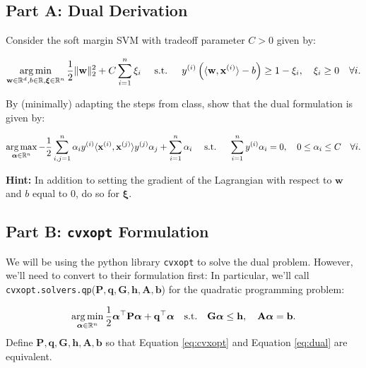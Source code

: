 \documentclass{article}
\DeclareMathOperator*{\argmin}{arg\,min}
\DeclareMathOperator*{\argmax}{arg\,max}
\begin{document}
\subsection*{Part A: Dual Derivation}

Consider the soft margin SVM with tradeoff parameter $C > 0$ given by:

\begin{align}
    \argmin_{\mathbf{w} \in \mathbb{R}^d, b \in \mathbb{R}, \boldsymbol{\xi} \in \mathbb{R}^n}
    \frac12 \| \mathbf{w} \|_2^2 + C \sum_{i=1}^n \xi_i
    \quad \textnormal{ s.t. } \quad
    y^{(i)} \left( \langle \mathbf{w}, \mathbf{x}^{(i)} \rangle -b\right) \geq 1 - \xi_i,\quad \xi_i \geq 0 \quad  \forall i .
\end{align}

By (minimally) adapting the steps from class, show that the dual formulation is given by:

\begin{align}
    \argmax_{\boldsymbol{\alpha} \in \mathbb{R}^n}
    -\frac12 \sum_{i,j=1}^n \alpha_i y^{(i)}
    \langle \mathbf{x}^{(i)}, \mathbf{x}^{(j)} \rangle
    y^{(j)} \alpha_j
    + \sum_{i=1}^n \alpha_i
    \quad \textnormal{ s.t. } \quad
    \sum_{i=1}^n y^{(i)} \alpha_i = 0, \quad 0 \leq \alpha_i \leq C \quad \forall i.
    \label{eq:dual}
\end{align}

\textbf{Hint:} In addition to setting the gradient of the Lagrangian with respect to $\mathbf{w}$ and $b$ equal to 0, do so for $\boldsymbol{\xi}$.

\subsection*{Part B: \texttt{cvxopt} Formulation}


We will be using the python library \texttt{cvxopt} to solve the dual problem.
However, we'll need to convert to their formulation first:
In particular, we'll call \texttt{cvxopt.solvers.qp}($\mathbf{P, q, G, h, A, b}$) for the quadratic programming problem:

\begin{align}
    \label{eq:cvxopt}
    \argmin_{\boldsymbol{\alpha} \in \mathbb{R}^n}
    \frac12 \boldsymbol{\alpha}^\top \mathbf{P} \boldsymbol{\alpha}
    + \mathbf{q}^\top \boldsymbol{\alpha}
    \quad \textnormal{s.t.} \quad
    \mathbf{G} \boldsymbol{\alpha} \leq \mathbf{h},
    \quad \mathbf{A} \boldsymbol{\alpha} = \mathbf{b}.
\end{align}
Define $\mathbf{P, q, G, h, A, b}$ so that Equation \ref{eq:cvxopt} and Equation \ref{eq:dual} are equivalent.
\end{document}
